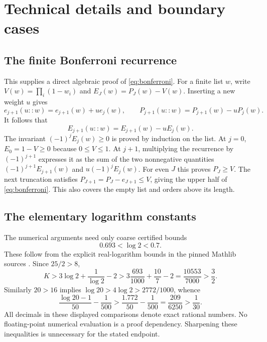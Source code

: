 \documentclass[11pt,a4paper]{article}
\theoremstyle{definition}
\theoremstyle{remark}
\numberwithin{equation}{section}
\begin{document}
\appendix
\section{Technical details and boundary cases}\label{app:technical}
\subsection{The finite Bonferroni recurrence}\label{app:bonferroni}
This supplies a direct algebraic proof of \eqref{eq:bonferroni}. For a finite
list $w$, write $V(w)=\prod_i(1-w_i)$ and $E_J(w)=P_J(w)-V(w)$. Inserting a
new weight $u$ gives
\[
 e_{j+1}(u::w)=e_{j+1}(w)+u e_j(w),\qquad
 P_{j+1}(u::w)=P_{j+1}(w)-uP_j(w).
\]
It follows that
\[
 E_{j+1}(u::w)=E_{j+1}(w)-uE_j(w).
\]
The invariant $(-1)^j E_j(w)\ge0$ is proved by induction on the list. At
$j=0$, $E_0=1-V\ge0$ because $0\le V\le1$. At $j+1$, multiplying the
recurrence by $(-1)^{j+1}$ expresses it as the sum of the two nonnegative
quantities $(-1)^{j+1}E_{j+1}(w)$ and $u(-1)^jE_j(w)$.
For even $J$ this proves $P_J\ge V$. The next truncation satisfies
$P_{J+1}=P_J-e_{J+1}\le V$, giving the upper half of
\eqref{eq:bonferroni}. This also covers the empty list and orders above its
length.

\subsection{The elementary logarithm constants}\label{app:constants}
The numerical arguments need only coarse certified bounds
\[
 0.693<\log2<0.7.
\]
These follow from the explicit real-logarithm bounds in the pinned Mathlib
sources \citep{MathlibPin}. Since $25/2>8$,
\[
 K>3\log2+\frac1{\log2}-2
   >3\frac{693}{1000}+\frac{10}{7}-2
   =\frac{10553}{7000}>\frac32.
\]
Similarly $20>16$ implies $\log20>4\log2>2772/1000$, whence
\[
 \frac{\log20-1}{50}-\frac1{500}
 >\frac{1.772}{50}-\frac1{500}
 =\frac{209}{6250}>\frac1{30}.
\]
All decimals in these displayed comparisons denote exact rational numbers.
No floating-point numerical evaluation is a proof dependency. Sharpening these
inequalities is unnecessary for the stated endpoint.
\end{document}

